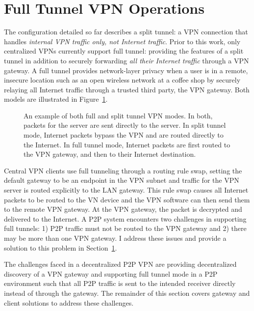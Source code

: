 \section{Full Tunnel VPN Operations}
\label{full_tunnel}

The configuration detailed so far describes a split tunnel: a VPN connection
that handles \emph{internal VPN traffic only, not Internet traffic}.  Prior to
this work, only centralized VPNs currently support full tunnel: providing the
features of a split tunnel in addition to securely forwarding \emph{all their
Internet traffic} through a VPN gateway.  A full tunnel provides network-layer
privacy when a user is in a remote, insecure location such as an open wireless
network at a coffee shop by securely relaying all Internet traffic through a
trusted third party, the VPN gateway.  Both models are illustrated in
Figure~\ref{fig:tunnel}.

\begin{figure}
\centering
{}
\caption[An example of both full and split tunnel VPN modes]{An example of both
full and split tunnel VPN modes.  In both, packets for the server are sent
directly to the server.  In split tunnel mode, Internet packets bypass the VPN
and are routed directly to the Internet.  In full tunnel mode, Internet packets
are first routed to the VPN gateway, and then to their Internet destination.}
\label{fig:tunnel}
\end{figure}

Central VPN clients use full tunneling through a routing rule swap, setting the
default gateway to be an endpoint in the VPN subnet and traffic for the VPN
server is routed explicitly to the LAN gateway.  This rule swap causes all
Internet packets to be routed to the VN device and the VPN software can then
send them to the remote VPN gateway.  At the VPN gateway, the packet is
decrypted and delivered to the Internet.  A P2P system encounters two
challenges in supporting full tunnels:  1) P2P traffic must not be routed to
the VPN gateway and 2) there may be more than one VPN gateway.  I address these
issues and provide a solution to this problem in Section~\ref{full_tunnel}.

The challenges faced in a decentralized P2P VPN are providing decentralized
discovery of a VPN gateway and supporting full tunnel mode in a P2P environment
such that all P2P traffic is sent to the intended receiver directly instead of
through the gateway.  The remainder of this section covers gateway and
client solutions to address these challenges.

